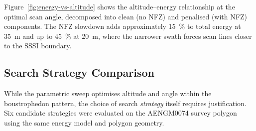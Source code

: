 Figure~\ref{fig:energy-vs-altitude} shows the altitude--energy relationship at the optimal scan angle, decomposed into clean (no NFZ) and penalised (with NFZ) components.
The NFZ slowdown adds approximately \SI{15}{\percent} to total energy at \SI{35}{\metre} and up to \SI{45}{\percent} at \SI{20}{\metre}, where the narrower swath forces scan lines closer to the SSSI boundary.

\subsection{Search Strategy Comparison}\label{sec:strategy-compare}

While the parametric sweep optimises altitude and angle within the boustrophedon pattern, the choice of search \emph{strategy} itself requires justification.
Six candidate strategies were evaluated on the AENGM0074 survey polygon using the same energy model and polygon geometry.

